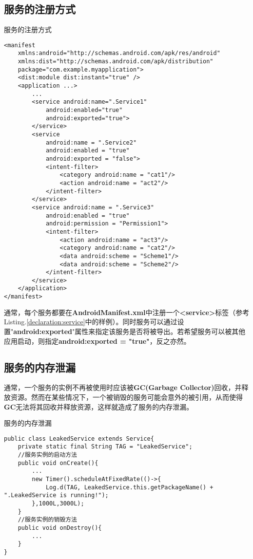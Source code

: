 \subsection{服务的注册方式}
\begin{listing}[htbp]
	\centering
	\caption{服务的注册方式}
	\begin{verbatim}
<manifest
	xmlns:android="http://schemas.android.com/apk/res/android"
	xmlns:dist="http://schemas.android.com/apk/distribution"
	package="com.example.myapplication">
	<dist:module dist:instant="true" />
	<application ...>
		...
		<service android:name=".Service1"
			android:enabled="true"
			android:exported="true">
		</service>
		<service
			android:name = ".Service2"
			android:enabled = "true"
			android:exported = "false">
			<intent-filter>
				<category android:name = "cat1"/>
				<action android:name = "act2"/>
			</intent-filter>
		</service>
		<service android:name = ".Service3"
			android:enabled = "true"
			android:permission = "Permission1">
			<intent-filter>
				<action android:name = "act3"/>
				<category android:name = "cat2"/>
				<data android:scheme = "Scheme1"/>
				<data android:scheme = "Scheme2"/>
			</intent-filter>
		</service>
	</application>
</manifest>
	\end{verbatim}
	\label{declaration:service}
\end{listing}
通常，每个服务都要在\textbf{AndroidManifest.xml}中注册一个\textbf{<service>}标签（参考Listing.\textcolor{red}{\ref{declaration:service}}中的样例）。同时服务可以通过设置"\textbf{android:exported}"属性来指定该服务是否将被导出。若希望服务可以被其他应用启动，则指定\textbf{android:exported = "true"}，反之亦然。
%
%
%
%
%
%
%
%
\subsection{服务的内存泄漏}\label{service_leak}
通常，一个服务的实例不再被使用时应该被\textbf{GC(Garbage Collector)}回收，并释放资源。然而在某些情况下，一个被销毁的服务可能会意外的被引用，从而使得\textbf{GC}无法将其回收并释放资源，这样就造成了服务的内存泄漏。
\begin{listing}[htbp]
	\centering
	\caption{服务的内存泄漏}
	\begin{verbatim}
public class LeakedService extends Service{
	private static final String TAG = "LeakedService";
	//服务实例的启动方法
	public void onCreate(){
		...
		new Timer().scheduleAtFixedRate(()->{
			Log.d(TAG, LeakedService.this.getPackageName() + ".LeakedService is running!");
		},1000L,3000L);
	}
	//服务实例的销毁方法
	public void onDestroy(){
		...
	}
}
	\end{verbatim}
	\label{leaked example:service}
\end{listing}

